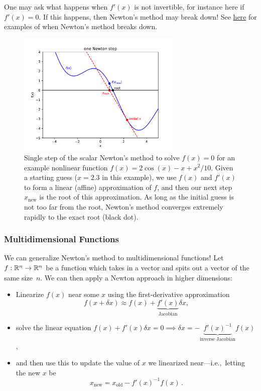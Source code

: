 One may ask what happens when $f'(x)$ is not invertible, for instance here if $f'(x) = 0$. If this happens, then Newton's method may break down! See \href{https://en.wikipedia.org/wiki/Newton%27s_method#Failure_analysis}{here} for examples of when Newton's method breaks down.

\begin{figure}
    \centering
    \includegraphics[width=0.7\textwidth]{figures/newton-step}
    \caption{Single step of the scalar Newton's method to solve $f(x)=0$ for an example nonlinear function $f(x) = 2\cos(x) - x + x^2/10$.  Given a starting guess ($x = 2.3$ in this example), we use $f(x)$ and $f'(x)$ to form a linear (affine) approximation of $f$, and then our next step $x_\mathrm{new}$ is the root of this approximation.  As long as the initial guess is not too far from the root, Newton's method converges extremely rapidly to the exact root (black dot).}
    \label{fig:newton-step}
\end{figure}

\subsubsection{Multidimensional Functions}
We can generalize Newton's method to multidimensional functions! Let $f: \mathbb R^n \to \mathbb R^n$ be a function which takes in a vector and spits out a vector of the same size~$n$. We can then apply a Newton approach in higher dimensions: 
\begin{itemize}
    \item Linearize $f(x)$ near some $x$ using the first-derivative approximation 
    \[
    f(x + \delta x) \approx f(x) + \underbrace{f'(x)}_\text{Jacobian} \delta x,
    \]
    \item solve the linear equation $f(x) + f'(x) \delta x = 0 \implies \delta x = -\underbrace{f'(x)^{-1}}_\text{inverse Jacobian} f(x)$,
    \item and then use this to update the value of $x$ we linearized near---i.e.,~letting the new $x$ be $$x_\text{new} = x_\text{old} - f'(x)^{-1}f(x)\, .$$
\end{itemize}

